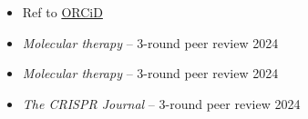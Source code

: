 






% 





\begin{itemize}
    \item[] \hfill Ref to \href{https://orcid.org/0000-0002-4934-4731}{ORCiD}
    \item \textit{Molecular therapy} -- 3-round peer review \hfill 2024
    \item \textit{Molecular therapy} -- 3-round peer review \hfill 2024
    \item \textit{The CRISPR Journal} -- 3-round peer review \hfill 2024
\end{itemize}




